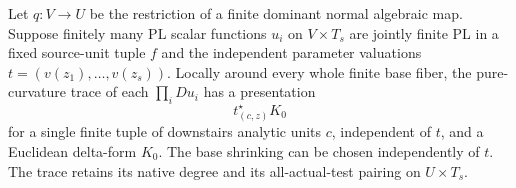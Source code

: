 \begin{lemma}
\label{r16ft:uniform}
Let $q:V\to U$ be the restriction of a finite dominant normal algebraic
map. Suppose finitely many PL scalar functions $u_i$ on $V\times T_s$
are jointly finite PL in a fixed source-unit tuple $f$ and the
independent parameter valuations $t=(v(z_1),\ldots,v(z_s))$.
Locally around every whole finite base fiber, the pure-curvature trace
of each $\prod_iDu_i$ has a presentation
\[
 t_{(c,z)}^\star K_0
 \tag{FT16.4}\label{r16ft:uniform-output}
\]
for a single finite tuple of downstairs analytic units $c$, independent
of $t$, and a Euclidean delta-form $K_0$. The base shrinking can be
chosen independently of $t$. The trace retains its native degree and
its all-actual-test pairing on $U\times T_s$.
\end{lemma}

